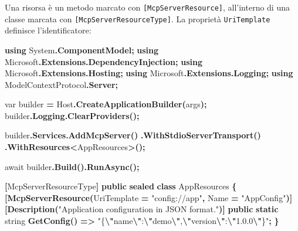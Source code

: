 \documentclass[
  italian,
  10pt,
]{book}
\newenvironment{Shaded}{\begin{snugshade}}{\end{snugshade}}
\newcommand{\DataTypeTok}[1]{\textcolor[rgb]{0.13,0.29,0.53}{#1}}
\newcommand{\FunctionTok}[1]{\textcolor[rgb]{0.13,0.29,0.53}{\textbf{#1}}}
\newcommand{\KeywordTok}[1]{\textcolor[rgb]{0.13,0.29,0.53}{\textbf{#1}}}
\newcommand{\NormalTok}[1]{#1}
\newcommand{\OperatorTok}[1]{\textcolor[rgb]{0.81,0.36,0.00}{\textbf{#1}}}
\newcommand{\SpecialCharTok}[1]{\textcolor[rgb]{0.81,0.36,0.00}{\textbf{#1}}}
\newcommand{\StringTok}[1]{\textcolor[rgb]{0.31,0.60,0.02}{#1}}
\begin{document}
Una risorsa è un metodo marcato con \texttt{{[}McpServerResource{]}},
all'interno di una classe marcata con
\texttt{{[}McpServerResourceType{]}}. La proprietà \texttt{UriTemplate}
definisce l'identificatore:

\begin{Shaded}
\begin{Highlighting}[]
\KeywordTok{using}\NormalTok{ System}\OperatorTok{.}\FunctionTok{ComponentModel}\OperatorTok{;}
\KeywordTok{using}\NormalTok{ Microsoft}\OperatorTok{.}\FunctionTok{Extensions}\OperatorTok{.}\FunctionTok{DependencyInjection}\OperatorTok{;}
\KeywordTok{using}\NormalTok{ Microsoft}\OperatorTok{.}\FunctionTok{Extensions}\OperatorTok{.}\FunctionTok{Hosting}\OperatorTok{;}
\KeywordTok{using}\NormalTok{ Microsoft}\OperatorTok{.}\FunctionTok{Extensions}\OperatorTok{.}\FunctionTok{Logging}\OperatorTok{;}
\KeywordTok{using}\NormalTok{ ModelContextProtocol}\OperatorTok{.}\FunctionTok{Server}\OperatorTok{;}

\DataTypeTok{var}\NormalTok{ builder }\OperatorTok{=}\NormalTok{ Host}\OperatorTok{.}\FunctionTok{CreateApplicationBuilder}\OperatorTok{(}\NormalTok{args}\OperatorTok{);}
\NormalTok{builder}\OperatorTok{.}\FunctionTok{Logging}\OperatorTok{.}\FunctionTok{ClearProviders}\OperatorTok{();}

\NormalTok{builder}\OperatorTok{.}\FunctionTok{Services}\OperatorTok{.}\FunctionTok{AddMcpServer}\OperatorTok{()}
    \OperatorTok{.}\FunctionTok{WithStdioServerTransport}\OperatorTok{()}
    \OperatorTok{.}\FunctionTok{WithResources}\OperatorTok{\textless{}}\NormalTok{AppResources}\OperatorTok{\textgreater{}();}

\NormalTok{await builder}\OperatorTok{.}\FunctionTok{Build}\OperatorTok{().}\FunctionTok{RunAsync}\OperatorTok{();}

\OperatorTok{[}\NormalTok{McpServerResourceType}\OperatorTok{]}
\KeywordTok{public} \KeywordTok{sealed} \KeywordTok{class}\NormalTok{ AppResources}
\OperatorTok{\{}
    \OperatorTok{[}\FunctionTok{McpServerResource}\OperatorTok{(}\NormalTok{UriTemplate }\OperatorTok{=} \StringTok{"config://app"}\OperatorTok{,}\NormalTok{ Name }\OperatorTok{=} \StringTok{"AppConfig"}\OperatorTok{)]}
    \OperatorTok{[}\FunctionTok{Description}\OperatorTok{(}\StringTok{"Application configuration in JSON format."}\OperatorTok{)]}
    \KeywordTok{public} \KeywordTok{static} \DataTypeTok{string} \FunctionTok{GetConfig}\OperatorTok{()}
        \OperatorTok{=\textgreater{}} \StringTok{"\{}\SpecialCharTok{\textbackslash{}"}\StringTok{name}\SpecialCharTok{\textbackslash{}"}\StringTok{:}\SpecialCharTok{\textbackslash{}"}\StringTok{demo}\SpecialCharTok{\textbackslash{}"}\StringTok{,}\SpecialCharTok{\textbackslash{}"}\StringTok{version}\SpecialCharTok{\textbackslash{}"}\StringTok{:}\SpecialCharTok{\textbackslash{}"}\StringTok{1.0.0}\SpecialCharTok{\textbackslash{}"}\StringTok{\}"}\OperatorTok{;}
\OperatorTok{\}}
\end{Highlighting}
\end{Shaded}
\end{document}
